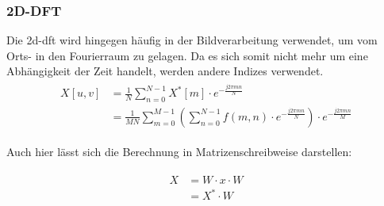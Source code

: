 \subsubsection{2D-DFT}
Die \gls{2d-dft} wird hingegen häufig in der Bildverarbeitung verwendet, um vom Orts- in den Fourierraum zu gelagen. Da es sich somit nicht mehr um eine Abhängigkeit 
der Zeit handelt, werden andere Indizes verwendet.
\begin{align}
\begin{split}
X[u,v] 	&= \frac{1}{N} \sum^{N-1}_{n=0} X^* \left[ m \right] \cdot e^{-\frac{j 2 \pi m n}{N}}\\
	&= \frac{1}{MN} \sum^{M-1}_{m=0} \left( \sum^{N-1}_{n=0} f(m,n) \cdot e^{-\frac{j 2 \pi m n}{N}} \right) \cdot e^{-\frac{j 2 \pi m n}{M}}
\end{split}
\end{align}

Auch hier lässt sich die Berechnung in Matrizenschreibweise darstellen:

\begin{align}
\begin{split}\label{eq:2D-DFT_MatrixMult}
 X &= W \cdot x \cdot W \\
                    &= X^* \cdot W
\end{split}
\end{align}

